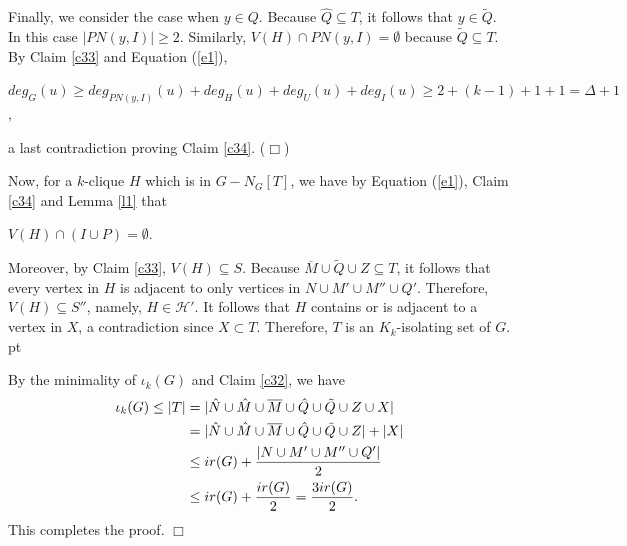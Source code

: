 \documentclass[11pt]{article}
\newcommand{\qed}{$\Box$}
\newcommand{\smallqed}{{\tiny ($\Box$)}}
\newcommand{\2}{ \vspace{0.2cm} }
\newcommand{\1}{ \vspace{0.1cm} }
\begin{document}
Finally, we consider the case when $y \in Q$. Because $\hat{Q} \subseteq T$, it follows that $y \in \tilde{Q}$. In this case $|PN(y, I)| \geq 2$. Similarly, $V(H) \cap PN(y, I) = \emptyset$ because $\tilde{Q} \subseteq T$. By Claim \ref{c33} and Equation (\ref{e1}),
\begin{center}
$deg_{G}(u) \geq deg_{PN(y, I)}(u) + deg_{H}(u) + deg_{U}(u) + deg_{I}(u) \geq 2 + (k - 1) + 1 + 1 = \Delta + 1$,
\end{center}
\noindent a last contradiction
proving Claim \ref{c34}.
\smallqed

\indent Now, for a $k$-clique $H$ which is in $G - N_{G}[T]$, we have by Equation (\ref{e1}), Claim \ref{c34} and Lemma \ref{l1} that
\begin{center}
$V(H) \cap (I \cup P) = \emptyset$.
\end{center}
\noindent Moreover, by Claim \ref{c33}, $V(H) \subseteq S$. Because $\overline{M} \cup \tilde{Q} \cup Z \subseteq T$, it follows that every vertex in $H$ is adjacent to only vertices in $N \cup M' \cup M'' \cup Q'$. Therefore, $V(H) \subseteq S''$, namely, $H \in \mathcal{H}'$. It follows that $H$ contains or is adjacent to a vertex in $X$, a contradiction since $X \subset T$. Therefore, $T$ is an $K_{k}$-isolating set of $G$.
 pt

\noindent By the minimality of $\iota_{k}(G)$ and Claim \ref{c32}, we have
\begin{align}
\iota_{k}(G) \leq |T| &=    |\hat{N} \cup \hat{M} \cup \overline{M} \cup \hat{Q} \cup \tilde{Q} \cup Z \cup X|\notag\\
                      &=    |\hat{N} \cup \hat{M} \cup \overline{M} \cup \hat{Q} \cup \tilde{Q} \cup Z| + |X|\notag\\
                      &\leq ir(G) + \frac{|N \cup M' \cup M'' \cup Q'|}{2}\notag\\
                      &\leq ir(G) + \frac{ir(G)}{2} = \frac{3ir(G)}{2}.\notag
\end{align}
\noindent This completes the proof.
\qed
\end{document}

